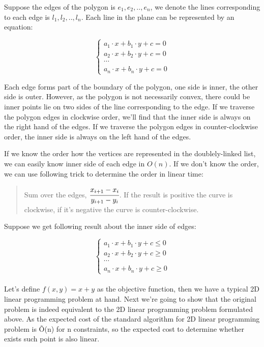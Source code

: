 
Suppose the edges of the polygon is ${e_1, e_2, .., e_n}$, we denote the lines corresponding to each edge is ${l_1, l_2, .., l_n}$. Each line in the plane can be represented by an equation:

\[
  \left\{
      \begin{array}{c}
          a_1 \cdot x + b_1 \cdot y + c = 0 \\
          a_2 \cdot x + b_2 \cdot y + c = 0 \\
          \cdots \\
          a_n \cdot x + b_n \cdot y + c = 0
      \end{array}
  \right.
\]

Each edge forms part of the boundary of the polygon, one side is inner, the other side is outer. However, as the polygon is not necessarily convex, there could be inner points lie on two sides of the line corresponding to the edge. If we traverse the polygon edges in clockwise order, we'll find that the inner side is always on the right hand of the edges. If we traverse the polygon edges in counter-clockwise order, the inner side is always on the left hand of the edges.

If we know the order how the vertices are represented in the doublely-linked list, we can easily know inner side of each edge in $O(n)$. If we don't know the order, we can use following trick to determine the order in linear time:

\begin{quote}
Sum over the edges, $\cfrac{x_{i+1}-x_i}{y_{i+1}-y_i}$. If the result is positive the curve is clockwise, if it's negative the curve is counter-clockwise.
\end{quote}

Suppose we get following result about the inner side of edges:

\[
  \left\{
      \begin{array}{c}
          a_1 \cdot x + b_1 \cdot y + c \leq 0 \\
          a_2 \cdot x + b_2 \cdot y + c \geq 0 \\
          \cdots \\
          a_n \cdot x + b_n \cdot y + c \geq 0
      \end{array}
  \right.
\]\\

Let's define $f(x, y) = x + y$ as the objective function, then we have a typical 2D linear programming problem at hand. Next we're going to show that the original problem is indeed equivalent to the 2D linear programming problem formulated above. As the expected cost of the standard algorithm for 2D linear programming problem is \~O(n) for n constraints, so the expected cost to determine whether exists such point is also linear.\\

